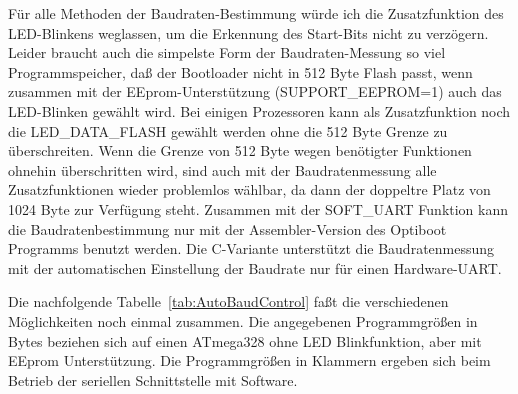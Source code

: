 Für alle Methoden der Baudraten-Bestimmung würde ich die Zusatzfunktion des
LED-Blinkens weglassen, um die Erkennung des Start-Bits nicht zu verzögern.
Leider braucht auch die simpelste Form der Baudraten-Messung so viel
Programmspeicher, daß der Bootloader nicht in 512 Byte Flash passt,
wenn zusammen mit der EEprom-Unterstützung (SUPPORT\_EEPROM=1) auch
das LED-Blinken gewählt wird.
Bei einigen Prozessoren kann als Zusatzfunktion noch die LED\_DATA\_FLASH
gewählt werden ohne die 512 Byte Grenze zu überschreiten. 
Wenn die Grenze von 512 Byte wegen benötigter Funktionen ohnehin überschritten
wird, sind auch mit der Baudratenmessung alle Zusatzfunktionen 
wieder problemlos wählbar, da dann der doppeltre Platz von 1024 Byte zur Verfügung steht. 
Zusammen mit der SOFT\_UART Funktion kann die Baudratenbestimmung nur mit
der Assembler-Version des Optiboot Programms benutzt werden.
Die C-Variante unterstützt die Baudratenmessung mit der automatischen Einstellung
der Baudrate nur für einen Hardware-UART.

Die nachfolgende Tabelle~\ref{tab:AutoBaudControl} faßt die verschiedenen Möglichkeiten noch einmal zusammen.
Die angegebenen Programmgrößen in Bytes beziehen sich auf einen  ATmega328 ohne LED Blinkfunktion, aber mit
EEprom Unterstützung. Die Programmgrößen in Klammern ergeben sich beim Betrieb der seriellen Schnittstelle mit
Software.


